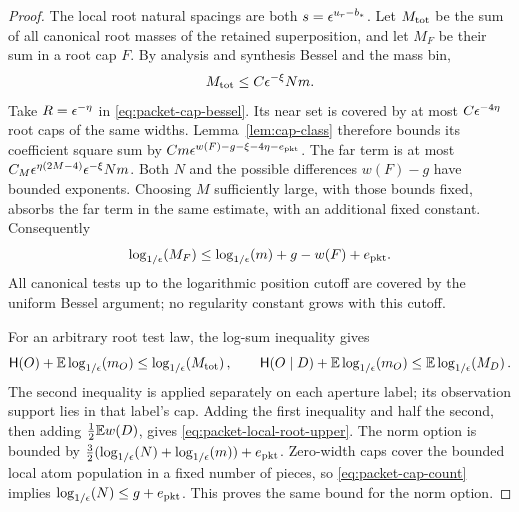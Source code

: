 \begin{proof}
The local root natural spacings are both
\(s=\epsilon^{u_r-b_*}\).  Let \(M_{\rm tot}\) be the sum of all
canonical root masses of the retained superposition, and let
\(M_F\) be their sum in a root cap \(F\).
By analysis and synthesis Bessel and the mass bin,
\begin{equation}
 M_{\rm tot}\le C\epsilon^{-\xi}Nm.
 \label{eq:packet-root-total-mass}
\end{equation}
Take \(R=\epsilon^{-\eta}\) in \eqref{eq:packet-cap-bessel}.
Its near set is covered by at most \(C\epsilon^{-4\eta}\) root
caps of the same widths.  Lemma~\ref{lem:cap-class} therefore
bounds its coefficient square sum by
\(C m\epsilon^{w(F)-g-\xi-4\eta-e_{\rm pkt}}\).
The far term is at most
\(C_M\epsilon^{\eta(2M-4)}\epsilon^{-\xi}Nm\).
Both \(N\) and the possible differences \(w(F)-g\) have bounded
exponents.  Choosing \(M\) sufficiently large, with those bounds
fixed, absorbs the far term in the same estimate, with an additional
fixed constant.  Consequently
\begin{equation}
 \log_{1/\epsilon}\!\left(M_F\right)\le\log_{1/\epsilon}\!\left(m\right)+g-w(F)+e_{\rm pkt}.
 \label{eq:packet-root-cap-mass}
\end{equation}
All canonical tests up to the logarithmic position cutoff are
covered by the uniform Bessel argument; no regularity constant grows
with this cutoff.

For an arbitrary root test law, the log-sum inequality gives
\[
 \mathsf H(O)+\mathbb E\log_{1/\epsilon}\!\left(m_O\right)\le\log_{1/\epsilon}\!\left(M_{\rm tot}\right),\qquad
 \mathsf H(O\mid D)+\mathbb E\log_{1/\epsilon}\!\left(m_O\right)\le\mathbb E\log_{1/\epsilon}\!\left(M_D\right).
\]
The second inequality is applied separately on each aperture label;
its observation support lies in that label's cap.  Adding the first
inequality and half the second, then adding \(\frac12\mathbb E w(D)\),
gives \eqref{eq:packet-local-root-upper}.
The norm option is bounded by
\(\frac32(\log_{1/\epsilon}\!\left(N\right)+\log_{1/\epsilon}\!\left(m\right))+e_{\rm pkt}\).
Zero-width caps cover the bounded local atom population in a fixed
number of pieces, so \eqref{eq:packet-cap-count} implies
\(\log_{1/\epsilon}\!\left(N\right)\le g+e_{\rm pkt}\).  This proves the same bound for
the norm option.


\end{proof}
